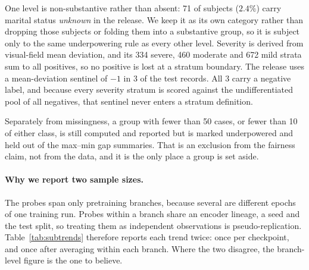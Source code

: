 \documentclass{article}
\begin{document}
One level is non-substantive rather than absent: 71 of \Ntest{} subjects
($2.4\%$) carry marital status \emph{unknown} in the release. We keep it as its
own category rather than dropping those subjects or folding them into a
substantive group, so it is subject only to the same underpowering rule as every
other level. Severity is derived from visual-field mean deviation, and its 334
severe, 460 moderate and 672 mild strata sum to all \Npos{} positives, so no
positive is lost at a stratum boundary. The release uses a mean-deviation
sentinel of $-1$ in 3 of the \Ntest{} test records. All 3 carry a negative label,
and because every severity stratum is scored against the undifferentiated pool of
all \Nneg{} negatives, that sentinel never enters a stratum definition.

Separately from missingness, a group with fewer than 50 cases, or fewer than 10
of either class, is still computed and reported but is marked underpowered and
held out of the max--min gap summaries. That is an exclusion from the fairness
claim, not from the data, and it is the only place a group is set aside.

\paragraph{Why we report two sample sizes.} The \NprobesSub{} probes span only
\NbranchesSub{} pretraining branches, because several are different epochs of
one training run. Probes within a branch share an encoder lineage, a seed and
the test split, so treating them as \NprobesSub{} independent observations is
pseudo-replication. Table~\ref{tab:subtrends} therefore reports each trend twice:
once per checkpoint, and once after averaging within each branch. Where the two
disagree, the branch-level figure is the one to believe.

\begin{table}[h]
\centering
\caption{Subgroup gap trends. ``gap range'' is the max--min subgroup AUC gap
observed across the \NprobesSub{} valid probes. $q$ is Benjamini--Hochberg
across the seven checkpoint-level tests. Branch $p$-values are unadjusted across
the same seven and, at $n{=}7$, descriptive only. Only gender survives checkpoint-level
correction at the conventional $0.05$ level, and it
\emph{narrows} as aggregate AUC rises. Race, ethnicity and disease severity share
the same $q$ just above that level, so no threshold admits race and severity
without also admitting ethnicity. Race is the one attribute whose
checkpoint-level trend does not
persist under branch aggregation ($p{=}0.4821$), where the effective sample is
\NbranchesSub{} independent branches rather than \NprobesSub{} probes; we
therefore draw no trend conclusion for race.}
\label{tab:subtrends}
\footnotesize
\setlength{\tabcolsep}{4pt}

\end{table}
\end{document}

